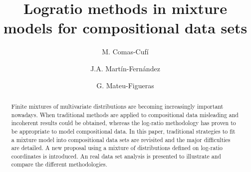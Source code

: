 \documentclass[12pt, a4paper]{article}
\title{Logratio methods in mixture models for compositional data sets}
\author[1]{M. Comas-Cufí}%
\author[1]{J.A. Martín-Fernández}
\author[1]{G. Mateu-Figueras}
\affil[1]{\small Department of Computer Science, Applied Mathematics and Statistics, Universitat de Girona}
\theoremstyle{definition}
\begin{document}
\maketitle

\newpage



\providecommand{\keywords}[1]{\textbf{Keywords:} #1}
\providecommand{\msc}[1]{\textbf{MSC2010:} #1}

\begin{abstract}
Finite mixtures of multivariate distributions are becoming increasingly important nowadays. When traditional methods are applied to compositional data misleading and incoherent results could be obtained, whereas the log-ratio methodology has proven to be appropriate to model compositional data. In this paper, traditional strategies to fit a mixture model into compositional data sets are revisited and the major difficulties are detailed. A new proposal using a mixture of distributions defined on log-ratio coordinates is introduced. An real data set analysis is presented to illustrate and compare the different methodologies.

\end{abstract}
\end{document}
